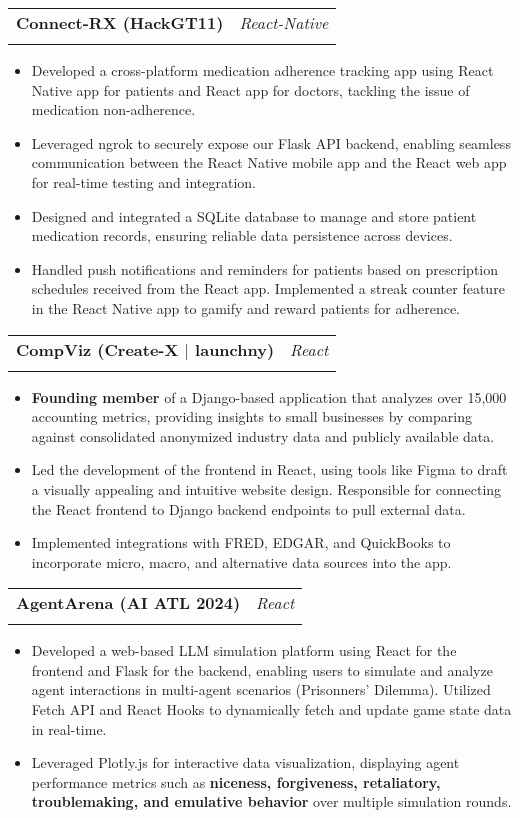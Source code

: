 \documentclass[letterpaper,11pt]{article}
\makeatletter
\newcommand{\resumeItem}[1]{
  \item\small{
    {#1 \vspace{-2pt}}
  }
}
\newcommand{\resumeSubheading}[4]{
  \vspace{-2pt}\item
    \begin{tabular*}{0.97\textwidth}[t]{l@{\extracolsep{\fill}}r}
      \textbf{#1} & #2 \\
      \textit{\small#3} & \textit{\small #4} \\
    \end{tabular*}\vspace{-7pt}
}
\newcommand{\resumeItemListStart}{\begin{itemize}}
\newcommand{\resumeItemListEnd}{\end{itemize}\vspace{-8pt}}
\makeatother
\begin{document}
    \resumeSubheading
    {Connect-RX (HackGT11)}{\textit{React-Native}}
    {}{}
    \resumeItemListStart
    \vspace{-5mm}
      \resumeItem{Developed a cross-platform medication adherence tracking app using React Native app for patients and React app for doctors, tackling the issue of medication non-adherence.}
      \resumeItem{Leveraged ngrok to securely expose our Flask API backend, enabling seamless communication between the React Native mobile app and the React web app for real-time testing and integration.}
      \resumeItem{Designed and integrated a SQLite database to manage and store patient medication records, ensuring reliable data persistence across devices.}
      \resumeItem{Handled push notifications and reminders for patients based on prescription schedules received from the React app. Implemented a streak counter feature in the React Native app to gamify and reward patients for adherence.}
    \resumeItemListEnd

    \resumeSubheading
    {CompViz (Create-X $|$ launchny)}{\textit{React}}
    {}{}
    \resumeItemListStart
    \vspace{-5mm}
      \resumeItem{\textbf{Founding member} of a Django-based application that analyzes over 15,000 accounting metrics, providing insights to small businesses by comparing against consolidated anonymized industry data and publicly available data.}
      \resumeItem{Led the development of the frontend in React, using tools like Figma to draft a visually appealing and intuitive website design. Responsible for connecting the React frontend to Django backend endpoints to pull external data.}
      \resumeItem{Implemented integrations with FRED, EDGAR, and QuickBooks to incorporate micro, macro, and alternative data sources into the app.}
    \resumeItemListEnd

    \resumeSubheading
    {AgentArena (AI ATL 2024)}{\textit{React}}
    {}{}
    \resumeItemListStart
    \vspace{-5mm}
      \resumeItem{Developed a web-based LLM simulation platform using React for the frontend and Flask for the backend, enabling users to simulate and analyze agent interactions in multi-agent scenarios (Prisonners' Dilemma). Utilized Fetch API and React Hooks to dynamically fetch and update game state data in real-time.}
      \resumeItem{Leveraged Plotly.js for interactive data visualization, displaying agent performance metrics such as \textbf{niceness, forgiveness, retaliatory, troublemaking, and emulative behavior} over multiple simulation rounds.}
    \resumeItemListEnd
  
\end{document}
